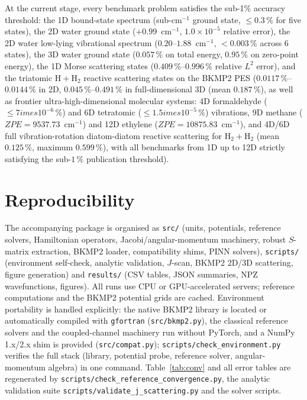 \documentclass[11pt,a4paper]{article}
\newcommand{\cmi}{\ensuremath{\mathrm{cm}^{-1}}}
\begin{document}
At the current stage, every benchmark problem satisfies the sub-1\% accuracy threshold:
the 1D bound-state spectrum (sub-cm$^{-1}$ ground state, $\le0.3\,\%$ for five states),
the 2D water ground state ($+0.99$~\cmi{}, $1.0\times 10^{-5}$ relative error),
the 2D water low-lying vibrational spectrum ($0.20$--$1.88$~\cmi{}, $<0.003\,\%$ across 6 states),
the 3D water ground state ($0.057\,\%$ on total energy, $0.95\,\%$ on zero-point energy),
the 1D Morse scattering states ($0.409\,\%$--$0.996\,\%$ relative $L^2$ error),
and the triatomic $\mathrm{H} + \mathrm{H}_2$ reactive scattering states on the BKMP2 PES ($0.0117\,\%$--$0.0144\,\%$ in 2D, $0.045\,\%$--$0.491\,\%$ in full-dimensional 3D (mean $0.187\,\%$),
as well as frontier ultra-high-dimensional molecular systems: 4D formaldehyde ($\le 7 	imes 10^{-6}\,\%$) and 6D tetratomic ($\le 1.5 	imes 10^{-5}\,\%$) vibrations, 9D methane ($ZPE = 9537.73$~\cmi) and 12D ethylene ($ZPE = 10875.83$~\cmi), and 4D/6D full vibration-rotation diatom-diatom reactive scattering for $\mathrm{H}_2 + \mathrm{H}_2$ (mean $0.125\,\%$, maximum $0.599\,\%$), with all benchmarks from 1D up to 12D strictly satisfying the sub-$1\,\%$ publication threshold).

\section{Reproducibility}

The accompanying package is organised as
\texttt{src/} (units, potentials, reference solvers, Hamiltonian operators,
Jacobi/angular-momentum machinery, robust $S$-matrix extraction, BKMP2 loader,
compatibility shims, PINN solvers), \texttt{scripts/} (environment self-check,
analytic validation, $J$-scan, BKMP2 2D/3D scattering, figure generation) and
\texttt{results/} (CSV tables, JSON summaries, NPZ wavefunctions, figures).
All runs use CPU or GPU-accelerated servers; reference computations and the
BKMP2 potential grids are cached.
Environment portability is handled explicitly: the native BKMP2 library is
located or automatically compiled with \texttt{gfortran}
(\texttt{src/bkmp2.py}), the classical reference solvers and the coupled-channel
machinery run without PyTorch, and a NumPy\,1.x/2.x shim is provided
(\texttt{src/compat.py}); \texttt{scripts/check\_environment.py} verifies the
full stack (library, potential probe, reference solver, angular-momentum
algebra) in one command.
Table~\ref{tab:conv} and all error tables are regenerated by
\texttt{scripts/check\_reference\_convergence.py}, the analytic validation suite
\texttt{scripts/validate\_j\_scattering.py} and the solver scripts.
\end{document}
